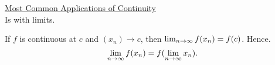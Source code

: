 \begin{center}
    \underline{Most Common Applications of Continuity} \\

    Is with limits.
\end{center}

If \(f\) is continuous at \(c\) and \((x_n) \to c\), then \(\lim_{n \rightarrow \infty} f(x_n) = f(c)\). Hence.
\[
    \lim_{n \rightarrow \infty} f(x_n) = f(\lim_{n \rightarrow \infty} x_n).
\]





